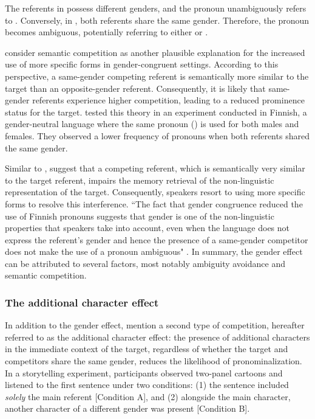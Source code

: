 The referents in  possess different genders, and the pronoun  unambiguously refers to . Conversely, in , both referents share the same gender. Therefore, the pronoun becomes ambiguous, potentially referring to either  or .

\citet{arnold2007effect} consider semantic competition as another plausible explanation for the increased use of more specific forms in gender-congruent settings. According to this perspective, a same-gender competing referent is semantically more similar to the target than an opposite-gender referent. Consequently, it is likely that same-gender referents experience higher competition, leading to a reduced prominence status for the target. \citet{Fukumura2013} tested this theory in an experiment conducted in Finnish, a gender-neutral language where the same pronoun () is used for both males and females. They observed a lower frequency of pronouns when both referents shared the same gender.

Similar to \citet{arnold2007effect}, \citet{Fukumura2013} suggest that a competing referent, which is semantically very similar to the target referent, impairs the memory retrieval of the non-linguistic representation of the target. Consequently, speakers resort to using more specific forms to resolve this interference. ``The fact that gender congruence reduced the use of Finnish pronouns suggests that gender is one of the non-linguistic properties that speakers take into account, even when the language does not express the referent's gender and hence the presence of a same-gender competitor does not make the use of a pronoun ambiguous" \citep[p, 1017]{Fukumura2013}. In summary, the gender effect can be attributed to several factors, most notably ambiguity avoidance and semantic competition.


\subsubsection{The additional character effect} 

In addition to the gender effect, \citet{arnold2007effect} mention a second type of competition, hereafter referred to as the additional character effect: the presence of additional characters in the immediate context of the target, regardless of whether the target and competitors share the same gender, reduces the likelihood of pronominalization. In a storytelling experiment, participants observed two-panel cartoons and listened to the first sentence under two conditions: (1) the sentence included \textit{solely} the main referent [Condition A], and (2) alongside the main character, another character of a different gender was present [Condition B].

